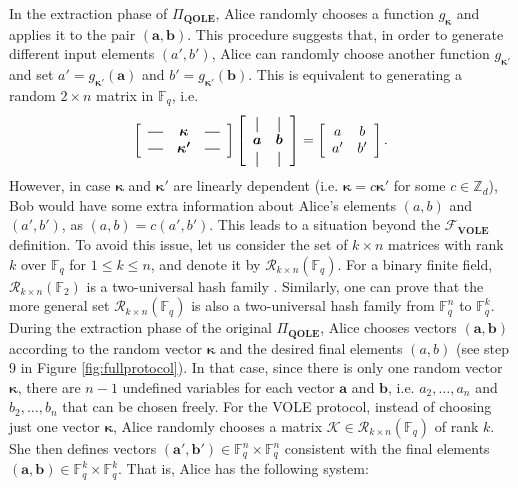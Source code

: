 In the extraction phase of $\Pi_{\textbf{QOLE}}$, Alice randomly chooses a function $g_{\bm{\kappa}}$ and applies it to the pair $(\bm{a},\bm{b})$. This procedure suggests that, in order to generate different input elements $(a', b')$, Alice can randomly choose another function $g_{\bm{\kappa'}}$ and set $a' = g_{\bm{\kappa'}}(\bm{a})$ and $b' = g_{\bm{\kappa'}}(\bm{b})$. This is equivalent to generating a random $2\times n$ matrix in  $\mathbb{F}_q$, i.e.
\[
\left[
  \begin{array}{ccc}
    \horzbar & \bm{\kappa} & \horzbar \\
    \horzbar & \bm{\kappa'} & \horzbar \\

  \end{array}
\right] \left[
  \begin{array}{cc}
    \vertbar & \vertbar  \\
    \bm{a} & \bm{b} \\
    \vertbar  & \vertbar \\
  \end{array}
\right]  = \left[
  \begin{array}{cc}
    a & b \\
    a' & b'
  \end{array}
\right].
\]
However, in case $\bm{\kappa}$ and $\bm{\kappa'}$ are linearly dependent (i.e. $\bm{\kappa} = c\bm{\kappa'}$ for some $c\in\mathbb{Z}_d$), Bob would have some extra information about Alice's elements $(a,b)$ and $(a', b')$, as $(a,b) = c( a', b')$. This leads to a situation beyond the  $\mathcal{F}_{\textbf{VOLE}}$ definition. 
To avoid this issue, let us consider the set of $k\times n$ matrices with rank $k$ over $\mathbb{F}_q$ for $1\leq k\leq n$, and denote it by $\mathcal{R}_{k\times n}(\mathbb{F}_q)$. For a binary finite field,  $\mathcal{R}_{k\times n}(\mathbb{F}_2)$ is a two-universal hash family \cite{D21, CW79}. Similarly, one can prove that the more general set $\mathcal{R}_{k\times n}(\mathbb{F}_q)$ is also a two-universal hash family from $\mathbb{F}_q^n$ to $\mathbb{F}_q^k$. During the extraction phase of the original $\Pi_{\textbf{QOLE}}$, Alice chooses vectors $(\bm{a}, \bm{b})$ according to the random vector $\bm{\kappa}$ and the desired final elements $(a,b)$ (see step 9 in Figure \ref{fig:fullprotocol}). In that case, since there is only one random vector $\bm{\kappa}$, there are $n-1$ undefined variables for each vector $\bm{a}$ and $\bm{b}$, i.e. $a_2, \ldots, a_n$ and $b_2, \ldots, b_n$ that can be chosen freely. For the VOLE protocol, instead of choosing just one vector $\bm{\kappa}$, Alice randomly chooses a  matrix $\mathcal{K}\in\mathcal{R}_{k\times n}(\mathbb{F}_q)$ of rank $k$. She then defines vectors $(\bm{a}', \bm{b}')\in \mathbb{F}^n_q\times \mathbb{F}^n_q$ consistent with the final elements $(\bm{a}, \bm{b})\in \mathbb{F}^k_q\times \mathbb{F}^k_q$. That is, Alice has the following system:

